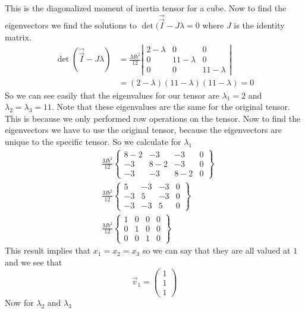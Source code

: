 \documentclass[11pt]{article}
\numberwithin{equation}{section}
\begin{document}
This is the diagonalized moment of inertia tensor for a cube. Now to find the eigenvectors we find the solutions to $\det(\vec{\vec{I}}-J\lambda=0$ where $J$ is the identity matrix.
\begin{align*}
\det(\vec{\vec{I}}-J\lambda) &= \frac{Mb^2}{12}\left|\begin{array}{ccc}
	2-\lambda&0	&0\\
	0	&11-\lambda	&0\\
	0	&0	&11-\lambda
		\end{array}\right|\\
&=(2-\lambda)(11-\lambda)(11-\lambda) = 0
\end{align*}
So we can see easily that the eigenvalues for our tensor are $\lambda_1=2$ and $\lambda_2=\lambda_3=11$. Note that these eigenvalues are the same for the original tensor. This is because we only performed row operations on the tensor. Now to find the eigenvectors we have to use the original tensor, because the eigenvectors are unique to the specific tensor. So we calculate for $\lambda_1$
\begin{align*}
&\frac{Mb^2}{12}\left\{\begin{array}{cccc}
	8-2	&-3	&-3	&0\\
	-3	&8-2	&-3	&0\\
	-3	&-3	&8-2	&0
		\end{array}\right\}\\
&\frac{Mb^2}{12}\left\{\begin{array}{cccc}
	5	&-3	&-3	&0\\
	-3	&5	&-3	&0\\
	-3	&-3	&5	&0
		\end{array}\right\}\\
&\frac{Mb^2}{12}\left\{\begin{array}{cccc}
	1	&0	&0	&0\\
	0	&1	&0	&0\\
	0	&0	&1	&0
		\end{array}\right\}
\end{align*}
This result implies that $x_1=x_2=x_3$ so we can say that they are all valued at $1$ and we see that
$$\vec{v}_1 = \left(\begin{array}{c}
	1\\ 1\\ 1
	\end{array}\right)$$
Now for $\lambda_2$ and $\lambda_3$
\end{document}
